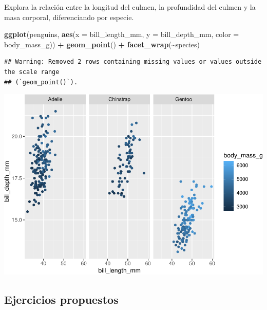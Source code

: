 \documentclass[
]{book}
\newenvironment{Shaded}{\begin{snugshade}}{\end{snugshade}}
\newcommand{\AttributeTok}[1]{\textcolor[rgb]{0.13,0.29,0.53}{#1}}
\newcommand{\FunctionTok}[1]{\textcolor[rgb]{0.13,0.29,0.53}{\textbf{#1}}}
\newcommand{\NormalTok}[1]{#1}
\newcommand{\SpecialCharTok}[1]{\textcolor[rgb]{0.81,0.36,0.00}{\textbf{#1}}}
\begin{document}
Explora la relación entre la longitud del culmen, la profundidad del culmen y la masa corporal, diferenciando por especie.

\begin{Shaded}
\begin{Highlighting}[]
\FunctionTok{ggplot}\NormalTok{(penguins, }\FunctionTok{aes}\NormalTok{(}\AttributeTok{x =}\NormalTok{ bill\_length\_mm, }\AttributeTok{y =}\NormalTok{ bill\_depth\_mm, }\AttributeTok{color =}\NormalTok{ body\_mass\_g)) }\SpecialCharTok{+}
  \FunctionTok{geom\_point}\NormalTok{() }\SpecialCharTok{+}
  \FunctionTok{facet\_wrap}\NormalTok{(}\SpecialCharTok{\textasciitilde{}}\NormalTok{species)}
\end{Highlighting}
\end{Shaded}

\begin{verbatim}
## Warning: Removed 2 rows containing missing values or values outside the scale range
## (`geom_point()`).
\end{verbatim}

\includegraphics{bookdown-demo_files/figure-latex/unnamed-chunk-191-1.pdf}

\hypertarget{ejercicios-propuestos}{%
\subsection{Ejercicios propuestos}\label{ejercicios-propuestos}}
\end{document}
